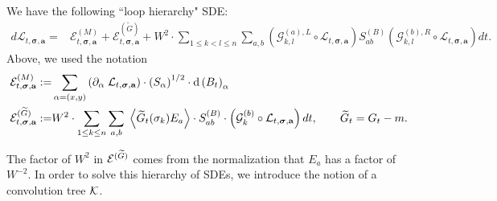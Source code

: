 %
\begin{lemma} \label{lem:SE_basic}
We have the following ``loop hierarchy" SDE:
\begin{align}\label{eq:mainStoflow}
    d\mathcal{L}_{t, \boldsymbol{\sigma}, \textbf{a}} =& 
    \mathcal{E}^{(M)}_{t, \boldsymbol{\sigma}, \textbf{a}} 
    +
    \mathcal{E}^{(\widetilde{G})}_{t, \boldsymbol{\sigma}, \textbf{a}} 
    +
   W^{2}\cdot \sum_{1 \le k < l \le n} \sum_{a, b} \left( \mathcal{G}^{(a), L}_{k, l} \circ \mathcal{L}_{t, \boldsymbol{\sigma}, \textbf{a}} \right) S^{(B)}_{ab} \left( \mathcal{G}^{(b), R}_{k, l} \circ \mathcal{L}_{t, \boldsymbol{\sigma}, \textbf{a}} \right) dt. 
\end{align}
 Above, we used the notation 
  \begin{align} \label{def_Edif}
\mathcal{E}^{(M)}_{t, \boldsymbol{\sigma}, \textbf{a}} :  = & \sum_{\alpha=(x,y)} 
  \left( \partial_{  \alpha} \; {\cal L}_{t, \boldsymbol{\sigma}, \textbf{a}}  \right)
 \cdot \left(S _\alpha\right)^{1/2} \cdot
  \mathrm{d} \left({B}_t\right)_{\alpha} \\\label{def_EwtG}
  \mathcal{E}^{(\widetilde{G})}_{t, \boldsymbol{\sigma}, \textbf{a}}: = &   W^{2}\cdot \sum_{1 \le k \le n} \sum_{a, b} \; 
 \left \langle \widetilde{G}_t(\sigma_k) E_a \right\rangle
  \cdot S^{(B)}_{ab} \cdot
  \left( {\cal G}^{(b)}_{k} \circ {\cal L}_{t, \boldsymbol{\sigma}, \textbf{a}} \right) dt ,\quad \quad \widetilde{G}_t = G_t - m.
\end{align}
  \end{lemma}
  
The factor of $W^{2}$ in ${\cal E}^{(\widetilde{G})}$ comes from the normalization that $E_{a}$ has a factor of $W^{-2}$. In order to solve this hierarchy of SDEs, we introduce the notion of a convolution tree ${\cal K}$.


